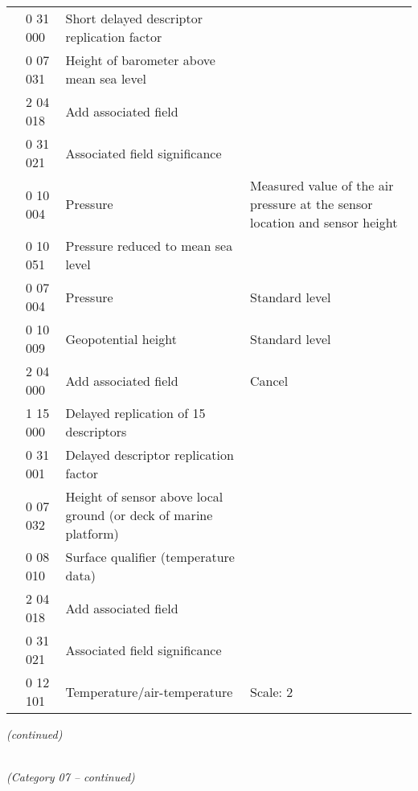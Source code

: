\begin{longtable}[]{@{}llll@{}}
& 0 31 000 & Short delayed descriptor replication factor &\tabularnewline
& 0 07 031 & Height of barometer above mean sea level &\tabularnewline
& 2 04 018 & Add associated field &\tabularnewline
& 0 31 021 & Associated field significance &\tabularnewline
& 0 10 004 & Pressure & Measured value of the air pressure at the sensor location and sensor height\tabularnewline
& 0 10 051 & Pressure reduced to mean sea level &\tabularnewline
& 0 07 004 & Pressure & Standard level\tabularnewline
& 0 10 009 & Geopotential height & Standard level\tabularnewline
& 2 04 000 & Add associated field & Cancel\tabularnewline
& 1 15 000 & Delayed replication of 15 descriptors &\tabularnewline
& 0 31 001 & Delayed descriptor replication factor &\tabularnewline
& 0 07 032 & Height of sensor above local ground (or deck of marine platform) &\tabularnewline
& 0 08 010 & Surface qualifier (temperature data) &\tabularnewline
& 2 04 018 & Add associated field &\tabularnewline
& 0 31 021 & Associated field significance &\tabularnewline
& 0 12 101 & Temperature/air-temperature & Scale: 2\tabularnewline
\bottomrule
\end{longtable}

\emph{(continued)}

\emph{\\
(Category 07 -- continued)}

